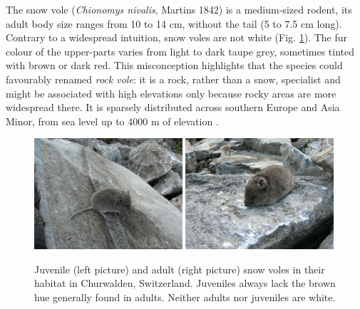 The snow vole (\textit{Chionomys nivalis}, Martins 1842) is a medium-sized rodent, its adult body size ranges from 10 to 14 cm, without the tail (5 to 7.5 cm long). Contrary to a widespread intuition, snow voles are not white (Fig. \ref{fig:juvvole}). The fur colour of the upper-parts varies from light to dark taupe grey, sometimes tinted with brown or dark red. This misconception highlights that the species could favourably renamed \emph{rock vole}: it is a rock, rather than a snow, specialist \parencite{Luque-larena2002} and might be associated with high elevations only because rocky areas are more widespread there. It is sparsely distributed across southern Europe and Asia Minor, from sea level up to 4000 m of elevation \parencite{Janeau1997}.
\begin{figure}[ht]
	\includegraphics[width=0.49\textwidth]{FiguresGeneral/juvvole.JPG}
	\hspace{0.02\textwidth}
	\includegraphics[width=0.49\textwidth]{FiguresGeneral/advole.JPG}
	\caption{Juvenile (left picture) and adult (right picture) snow voles in their habitat in Churwalden, Switzerland. Juveniles always lack the brown hue generally found in adults. Neither adults nor juveniles are white.}
	\label{fig:juvvole}
\end{figure}

